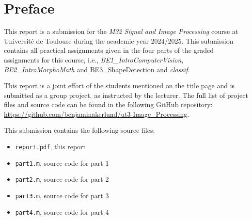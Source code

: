 \section*{Preface}


This report is a submission for the \textit{M32 Signal and Image Processing} course at Université de Toulouse during the academic year 2024/2025.
This submission contains all practical assignments given in the four parts of the graded assignments for this course, i.e., \textit{BE1\_IntroComputerVision}, \textit{BE2\_IntroMorphoMath} and {BE3\_ShapeDetection} and \textit{classif}.

This report is a joint effort of the students mentioned on the title page and is submitted as a group project, as instructed by the lecturer.
The full list of project files and source code can be found in the following GitHub repository: \url{https://github.com/benjaminakerlund/ut3-Image_Processing}.

This submission contains the following source files:
\begin{itemize}
    \item \verb|report.pdf|, this report
    \item \verb|part1.m|, source code for part 1
    \item \verb|part2.m|, source code for part 2
    \item \verb|part3.m|, source code for part 3
    \item \verb|part4.m|, source code for part 4
\end{itemize}




%




